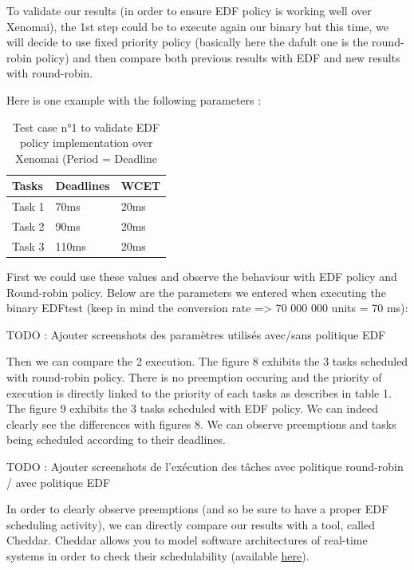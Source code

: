 \documentclass[12pt,hidelinks]{article}
\begin{document}
{\begin{enumerate}
    \end{enumerate}
        
        To validate our results (in order to ensure EDF policy is working well over Xenomai), the 1st step could be to execute again our binary but this time, we will decide to use fixed priority policy (basically here the dafult one is the round-robin policy) and then compare both previous results with EDF and new results with round-robin.\newline
        
        Here is one example with the following parameters :
        \begin{table}[ht]
        \centering
        \begin{tabular}{|l|l|l|}
        \hline
        Tasks&Deadlines&WCET\\\hline
        Task 1&70ms&20ms\\\hline
        Task 2&90ms&20ms\\\hline
        Task 3&110ms&20ms\\\hline
        \end{tabular} 
        \caption{Test case n°1 to validate EDF policy implementation over Xenomai (Period = Deadline}
        \label{tab1}
        \end{table}

        First we could use these values and observe the behaviour with EDF policy and Round-robin policy. Below are the parameters we entered when executing the binary EDFtest (keep in mind the conversion rate => 70 000 000 units = 70 ms):
        
        TODO : Ajouter screenshots des paramètres utilisés avec/sans politique EDF
        
        Then we can compare the 2 execution. The figure 8 exhibits the 3 tasks scheduled with round-robin policy. There is no preemption occuring and the priority of execution is directly linked to the priority of each tasks as describes in table 1.\newline
        The figure 9 exhibits the 3 tasks scheduled with EDF policy. We can indeed clearly see the differences with figures 8. We can observe preemptions and tasks being scheduled according to their deadlines.
        
        TODO : Ajouter screenshots de l'exécution des tâches avec politique round-robin / avec politique EDF
        
        In order to clearly observe preemptions (and so be sure to have a proper EDF scheduling activity), we can directly compare our results with a tool, called Cheddar. Cheddar allows you to model software architectures of real-time systems in order to check their schedulability (available \href{http://beru.univ-brest.fr/cheddar/#RefDownloadRelease}{here}). 
        
}
\end{document}
